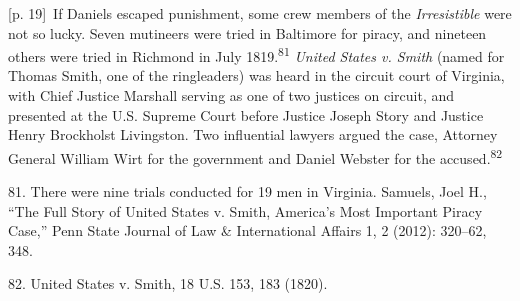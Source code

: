 \documentclass[10pt,a4paper]{article}
\begin{document}
{\scriptsize\color{gray} [p. 19]}\ If Daniels escaped punishment, some crew members of the \textit{Irresistible} were not so lucky. Seven mutineers were tried in Baltimore for piracy, and nineteen others were tried in Richmond in July 1819.\nobreak\textsuperscript{81} \textit{United States v. Smith} (named for Thomas Smith, one of the ringleaders) was heard in the circuit court of Virginia, with Chief Justice Marshall serving as one of two justices on circuit, and presented at the U.S. Supreme Court before Justice Joseph Story and Justice Henry Brockholst Livingston. Two influential lawyers argued the case, Attorney General William Wirt for the government and Daniel Webster for the accused.\nobreak\textsuperscript{82}\par{\small 81. There were nine trials conducted for 19 men in Virginia. Samuels, Joel H., “The Full Story of United States v. Smith, America’s Most Important Piracy Case,” Penn State Journal of Law \& International Affairs 1, 2 (2012): 320–62, 348.\par}{\small 82. United States v. Smith, 18 U.S. 153, 183 (1820).\par}
\end{document}
